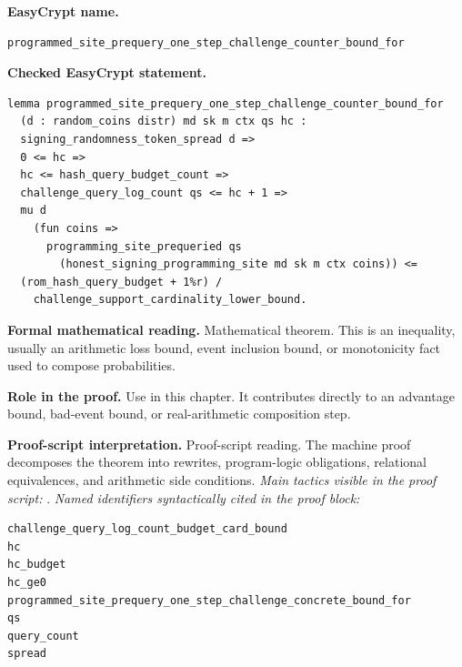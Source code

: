 \begin{formaltheorem}
\noindent\textbf{EasyCrypt name.}
\begin{lstlisting}[language=EasyCrypt,basicstyle=\ttfamily\scriptsize]
programmed_site_prequery_one_step_challenge_counter_bound_for
\end{lstlisting}
\noindent\textbf{Checked EasyCrypt statement.}
\begin{lstlisting}[language=EasyCrypt,basicstyle=\ttfamily\scriptsize]
lemma programmed_site_prequery_one_step_challenge_counter_bound_for
  (d : random_coins distr) md sk m ctx qs hc :
  signing_randomness_token_spread d =>
  0 <= hc =>
  hc <= hash_query_budget_count =>
  challenge_query_log_count qs <= hc + 1 =>
  mu d
    (fun coins =>
      programming_site_prequeried qs
        (honest_signing_programming_site md sk m ctx coins)) <=
  (rom_hash_query_budget + 1%r) /
    challenge_support_cardinality_lower_bound.
\end{lstlisting}
\noindent\textbf{Formal mathematical reading.}
Mathematical theorem. This is an inequality, usually an arithmetic loss bound, event inclusion bound, or monotonicity fact used to compose probabilities.

\noindent\textbf{Role in the proof.}
Use in this chapter. It contributes directly to an advantage bound, bad-event bound, or real-arithmetic composition step.

\noindent\textbf{Proof-script interpretation.}
Proof-script reading. The machine proof decomposes the theorem into rewrites, program-logic obligations, relational equivalences, and arithmetic side conditions.
\emph{Main tactics visible in the proof script:} .
\emph{Named identifiers syntactically cited in the proof block:}
\begin{lstlisting}[language=EasyCrypt,basicstyle=\ttfamily\scriptsize]
challenge_query_log_count_budget_card_bound
hc
hc_budget
hc_ge0
programmed_site_prequery_one_step_challenge_concrete_bound_for
qs
query_count
spread
\end{lstlisting}

\end{formaltheorem}

